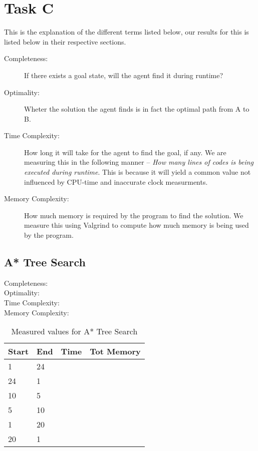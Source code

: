 
\chapter{Task C}
This is the explanation of the different terms listed below, our results for
this is listed below in their respective sections.
\begin{description}
\item[Completeness:			]
	If there exists a goal state, will the agent find it during runtime?
\item[Optimality:				]
	Wheter the solution the agent finds is in fact the optimal path from A to B.
\item[Time Complexity:	]
	How long it will take for the agent to find the goal, if any.  We are
	measuring this in the following manner -- \textit{How many lines of codes is
	being executed during runtime}.  This is because it will yield a common value
	not influenced by CPU-time and inaccurate clock measurments.
\item[Memory Complexity:]
	How much memory is required by the program to find the solution. We measure
	this using Valgrind to compute how much memory is being used by the program.
\end{description}

\section{A* Tree Search}
\begin{description}
\item[Completeness:			]
\item[Optimality:				]
\item[Time Complexity:	]
\item[Memory Complexity:]
\end{description}

\begin{table}[h]
\centering
\begin{tabular}{	p{} p{} 
									p{} p{} }\hline
	Start & End & Time & Tot Memory \\\hline
	1		&	24 	& 	&	\\
	24	&	1 	& 	&	\\
	10	&	5 	& 	&	\\
	5		&	10 	& 	&	\\
	1		&	20 	& 	&	\\
	20	&	1		&		&	\\
\end{tabular}
\caption{Measured values for A* Tree Search}\label{tbl:sumTree}
\end{table}

